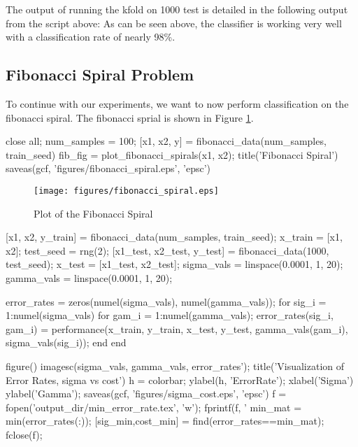 \documentclass[11pt, twoside]{article}   	%
\newenvironment{matlab}{\comment}{\endcomment}
\begin{document}
The output of running the kfold on 1000 test is detailed in the following
output from the script above: 
\color{lightgray}
\color{black}
As can be seen above, the classifier is working very well with a classification rate of nearly 98\%. 

\subsection{Fibonacci Spiral Problem}
To continue with our experiments, we want to now perform classification on
the fibonacci spiral. The fibonacci sprial is shown in Figure \ref{fig:fibonacci_spiral}. 

\begin{matlab}
close all;
num_samples = 100; 
[x1, x2, y] = fibonacci_data(num_samples, train_seed)
fib_fig = plot_fibonacci_spirals(x1, x2); 
title('Fibonacci Spiral')
saveas(gcf, 'figures/fibonacci_spiral.eps', 'epsc')
\end{matlab}

\begin{figure}[h]
\centering
\texttt{[image: figures/fibonacci\_spiral.eps]}
\caption{Plot of the Fibonacci Spiral}
\label{fig:fibonacci_spiral} 
\end{figure}


\begin{matlab}

[x1, x2, y_train] = fibonacci_data(num_samples, train_seed);
x_train = [x1, x2];
test_seed = rng(2); 
[x1_test, x2_test, y_test] = fibonacci_data(1000, test_seed);
x_test = [x1_test, x2_test];
sigma_vals = linspace(0.0001, 1, 20); 
gamma_vals = linspace(0.0001, 1, 20);

error_rates = zeros(numel(sigma_vals), numel(gamma_vals)); 
for sig_i = 1:numel(sigma_vals)
   for gam_i = 1:numel(gamma_vals); 
      error_rates(sig_i, gam_i) = performance(x_train, y_train, x_test, y_test, gamma_vals(gam_i), sigma_vals(sig_i)); 
   end
end

figure()
imagesc(sigma_vals, gamma_vals, error_rates');
title('Visualization of Error Rates, sigma vs cost')
h = colorbar;
ylabel(h, 'ErrorRate');
xlabel('Sigma')
ylabel('Gamma'); 
saveas(gcf, 'figures/sigma_cost.eps', 'epsc')
f = fopen('output_dir/min_error_rate.tex', 'w'); 
fprintf(f, '%
min_mat = min(error_rates(:));
[sig_min,cost_min] = find(error_rates==min_mat);
fclose(f);
\end{matlab}
\end{document}
